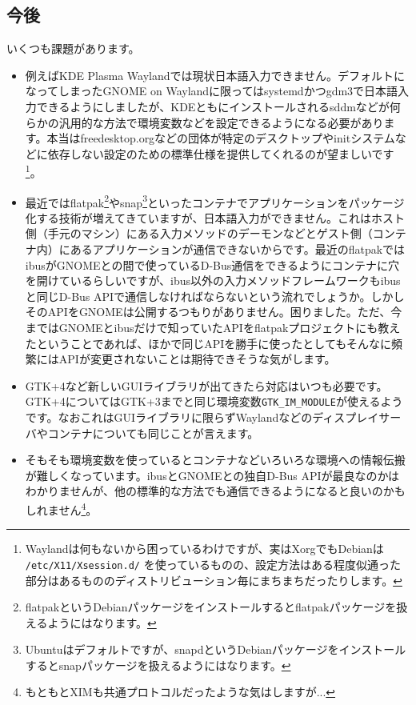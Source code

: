 \documentclass[mingoth,a4paper]{jsarticle}
\begin{document}
\subsection{今後}
いくつも課題があります。
\begin{itemize}
 \item 例えばKDE Plasma Waylandでは現状日本語入力できません。デフォルトになってしまったGNOME on Waylandに限ってはsystemdかつgdm3で日本語入力できるようにしましたが、KDEともにインストールされるsddmなどが何らかの汎用的な方法で環境変数などを設定できるようになる必要があります。本当はfreedesktop.orgなどの団体が特定のデスクトップやinitシステムなどに依存しない設定のための標準仕様を提供してくれるのが望ましいです\footnote{Waylandは何もないから困っているわけですが、実はXorgでもDebianは \texttt{/etc/X11/Xsession.d/} を使っているものの、設定方法はある程度似通った部分はあるもののディストリビューション毎にまちまちだったりします。}。
 \item 最近ではflatpak\footnote{flatpakというDebianパッケージをインストールするとflatpakパッケージを扱えるようにはなります。}やsnap\footnote{Ubuntuはデフォルトですが、snapdというDebianパッケージをインストールするとsnapパッケージを扱えるようにはなります。}といったコンテナでアプリケーションをパッケージ化する技術が増えてきていますが、日本語入力ができません。これはホスト側（手元のマシン）にある入力メソッドのデーモンなどとゲスト側（コンテナ内）にあるアプリケーションが通信できないからです。最近のflatpakではibusがGNOMEとの間で使っているD-Bus通信をできるようにコンテナに穴を開けているらしいですが、ibus以外の入力メソッドフレームワークもibusと同じD-Bus APIで通信しなければならないという流れでしょうか。しかしそのAPIをGNOMEは公開するつもりがありません。困りました。ただ、今まではGNOMEとibusだけで知っていたAPIをflatpakプロジェクトにも教えたということであれば、ほかで同じAPIを勝手に使ったとしてもそんなに頻繁にはAPIが変更されないことは期待できそうな気がします。
 \item GTK+4など新しいGUIライブラリが出てきたら対応はいつも必要です。GTK+4についてはGTK+3までと同じ環境変数\verb|GTK_IM_MODULE|が使えるようです。なおこれはGUIライブラリに限らずWaylandなどのディスプレイサーバやコンテナについても同じことが言えます。
 \item そもそも環境変数を使っているとコンテナなどいろいろな環境への情報伝搬が難しくなっています。ibusとGNOMEとの独自D-Bus APIが最良なのかはわかりませんが、他の標準的な方法でも通信できるようになると良いのかもしれません\footnote{もともとXIMも共通プロトコルだったような気はしますが...}。
\end{itemize}
\end{document}
